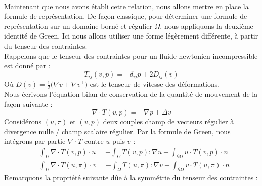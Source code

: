 \\
Maintenant que nous avons établi cette relation, nous allons mettre en place la formule de représentation. De façon classique, pour déterminer une formule de représentation sur un domaine borné et régulier $\Omega$, nous appliquons la deuxième identité de Green. Ici nous allons utiliser une forme légèrement différente,
à partir du tenseur des contraintes.\\
Rappelons que le tenseur des contraintes pour un fluide newtonien incompressible est donné par :
$$T_{ij}(v,p) = -\delta_{ij}p + 2D_{ij}(v) $$
Où $D(v) = \frac{1}{2}\big( \nabla v + \nabla v ^{\top} \big) $ est le tenseur de vitesse des déformations. \\
Nous écrivons l'équation bilan de conservation de la quantité de mouvement de la façon suivante :
$$\nabla \cdot T(v,p) = -\nabla p + \Delta v  $$
Considérons $(u,\pi)$ et $(v,p)$ deux couples champ de vecteurs régulier à divergence nulle / champ scalaire régulier.
Par la formule de Green, nous intégrons par partie $\nabla \cdot T$ contre $u$ puis $v$ :
\begin{align*}
    &\int_{\Omega} \nabla \cdot T(v,p) \cdot u = - \int_{\Omega} T(v,p) : \nabla u + \int_{\partial \Omega} u \cdot T(v,p) \cdot n \\
    &\int_{\Omega} \nabla \cdot T(u,\pi) \cdot v = - \int_{\Omega} T(u,\pi) : \nabla v + \int_{\partial \Omega} v \cdot T(u,\pi) \cdot n
\end{align*}
Remarquons la propriété suivante dûe à la symmétrie du tenseur des contraintes :


